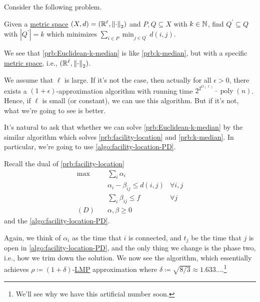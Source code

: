 Consider the following problem.

\begin{problem}\label{prb:Euclidean-k-median}
Given a \hyperref[def:metric]{metric space} \((X, d) = (\mathbb{\MakeUppercase{r}} ^\ell, \left\lVert \cdot \right\rVert _2 )\) and \(P, Q\subseteq X\) with \(k\in \mathbb{\MakeUppercase{n}} \), find \(Q^\prime \subseteq Q\) with \(\left\vert Q^\prime  \right\vert = k\) which minimizes \(\sum_{i\in P} \min _{j\in Q^\prime } d(i, j)\).
\end{problem}

We see that \autoref{prb:Euclidean-k-median} is like \autoref{prb:k-median}, but with a specific \hyperref[def:metric]{metric space}, i.e., \((\mathbb{\MakeUppercase{r}} ^\ell , \left\lVert \cdot \right\rVert _2)\).

\begin{note}
	We assume that \(\ell \) is large. If it's not the case, then actually for all \(\epsilon > 0\), there exists a \((1+\epsilon )\)-approximation algorithm with running time \(2^{2^{O(\ell )}}\cdot \mathop{\mathrm{poly}}(n)\). Hence, if \(\ell \) is small (or constant), we can use this algorithm. But if it's not, what we're going to see is better.
\end{note}

It's natural to ask that whether we can solve \autoref{prb:Euclidean-k-median} by the similar algorithm which solves \autoref{prb:facility-location} and \autoref{prb:k-median}. In particular, we're going to use \autoref{algo:facility-location-PD}.

\begin{prev}
	Recall the dual of \autoref{prb:facility-location}
	\begin{align*}
		\max~    & \sum_{i} \alpha _i                                  \\
		         & \alpha _i - \beta _{ij} \leq d(i, j) & \forall i, j \\
		         & \sum_{i} \beta _{ij} \leq f          & \forall j    \\
		(D)\quad & \alpha , \beta \geq 0
	\end{align*}
	and the \autoref{algo:facility-location-PD}.
\end{prev}

Again, we think of \(\alpha _i\) as the time that \(i\) is connected, and \(t_j\) be the time that \(j\) is open in \autoref{algo:facility-location-PD}, and the only thing we change is the phase two, i.e., how we trim down the solution. We now see the algorithm, which essentially achieves \(\rho \coloneqq (1 + \delta)\)-\hyperref[def:LMP]{LMP} approximation where \(\delta \coloneqq \sqrt{8 / 3} \approx 1.633\ldots\).\footnote{We'll see why we have this artificial number soon.}

